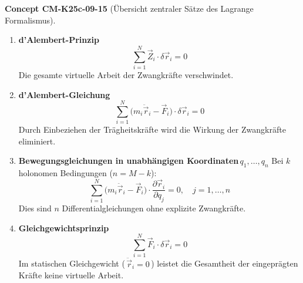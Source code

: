 \documentclass[10pt, letterpaper]{article}
\newcommand{\CustomHeading}[3]{%
  \par\medskip\noindent%
  \textbf{#1 #2} \textnormal{(#3)}.\enskip%
}
\newenvironment{CONC}[2]{\CustomHeading{Concept}{#1}{#2}}{}
\begin{document}
\begin{CONC}{CM-K25c-09-15}{Übersicht zentraler Sätze des Lagrange Formalismus}
\begin{enumerate}
  \item \textbf{d’Alembert-Prinzip}  
        \[
          \boxed{\;
            \sum_{i=1}^{N} \vec Z_i \!\cdot\! \delta\vec r_i = 0
          \;}
        \]
        Die gesamte virtuelle Arbeit der Zwangkräfte verschwindet.

  \item \textbf{d’Alembert-Gleichung}  
        \[
          \boxed{\;
            \sum_{i=1}^{N}
              \bigl(m_i\ddot{\vec r}_i - \vec F_i\bigr)
              \!\cdot\! \delta\vec r_i = 0
          \;}
        \]
        Durch Einbeziehen der Trägheitskräfte wird die Wirkung der
        Zwangkräfte eliminiert.

  \item \textbf{Bewegungsgleichungen in unabhängigen
        Koordinaten\,$q_1,\dots,q_n$}  
        Bei $k$ holonomen Bedingungen ($n=M-k$):
        \[
          \boxed{\;
            \sum_{i=1}^{N}
              \bigl(m_i\ddot{\vec r}_i - \vec F_i\bigr)
              \!\cdot\!
              \frac{\partial\vec r_i}{\partial q_j}
            = 0,
            \quad j=1,\dots,n
          \;}
        \]
        Dies sind $n$ Differentialgleichungen ohne explizite
        Zwangkräfte.

  \item \textbf{Gleichgewichtsprinzip}  
        \[
          \boxed{\;
            \sum_{i=1}^{N} \vec F_i \!\cdot\! \delta\vec r_i = 0
          \;}
        \]
        Im statischen Gleichgewicht (\,${\ddot{\vec r}}_i=0$\,) leistet
        die Gesamtheit der eingeprägten Kräfte keine virtuelle Arbeit.
\end{enumerate}
\end{CONC}
\end{document}
